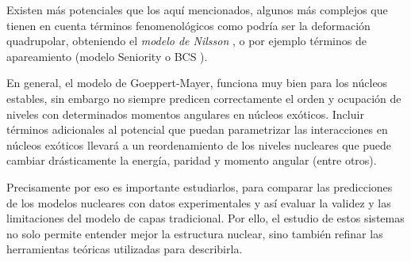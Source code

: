 
\begin{minipage}{0.63\linewidth}
\vspace{0.8em}

Existen más potenciales que los aquí mencionados, algunos más complejos que tienen en cuenta términos fenomenológicos como podría ser la deformación quadrupolar, obteniendo el \textit{modelo de Nilsson} \cite{Nilsson:212345}, o por ejemplo términos de apareamiento (modelo Seniority o BCS \cite{Broglia}). 

\vspace{0.95em}

En general, el modelo de Goeppert-Mayer, funciona muy bien para los núcleos estables, sin embargo no siempre predicen correctamente el orden y ocupación de niveles con determinados momentos angulares en núcleos exóticos. Incluir términos adicionales al potencial que puedan parametrizar las interacciones en núcleos exóticos llevará a un reordenamiento de los niveles nucleares que puede cambiar drásticamente la energía, paridad y momento angular (entre otros). 

\vspace{0.95em}

Precisamente por eso es importante estudiarlos, para comparar las predicciones de los modelos nucleares con datos experimentales y así evaluar la validez y las limitaciones del modelo de capas tradicional. Por ello, el estudio de estos sistemas no solo permite entender mejor la estructura nuclear, sino también refinar las herramientas teóricas utilizadas para describirla.


\end{minipage}
\hfill
